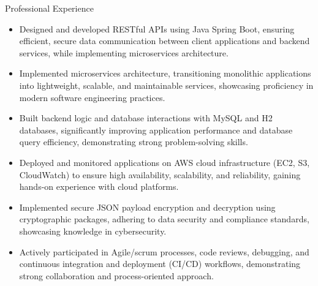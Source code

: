 \documentclass{resume}
\begin{document}
\begin{experienceSection}{Professional Experience}
    \experienceItem[
        company={Cognizant},
        location={Coimbatore, In},
        position={Program Trainee Analyst },
        duration={Mar 2021 – Aug 2021}
    ]
    \begin{itemize}
    \itemsep -6pt {}
    \item Designed and developed RESTful APIs using Java Spring Boot, ensuring efficient, secure data communication between client applications and backend services, while implementing microservices architecture.
    \item Implemented microservices architecture, transitioning monolithic applications into lightweight, scalable, and maintainable services, showcasing proficiency in modern software engineering practices.
    \item Built backend logic and database interactions with MySQL and H2 databases, significantly improving application performance and database query efficiency, demonstrating strong problem-solving skills.
    \item Deployed and monitored applications on AWS cloud infrastructure (EC2, S3, CloudWatch) to ensure high availability, scalability, and reliability, gaining hands-on experience with cloud platforms.
    \item Implemented secure JSON payload encryption and decryption using cryptographic packages, adhering to data security and compliance standards, showcasing knowledge in cybersecurity.
    \item Actively participated in Agile/scrum processes, code reviews, debugging, and continuous integration and deployment (CI/CD) workflows, demonstrating strong collaboration and process-oriented approach.
    \end{itemize}

\end{experienceSection}
\end{document}
